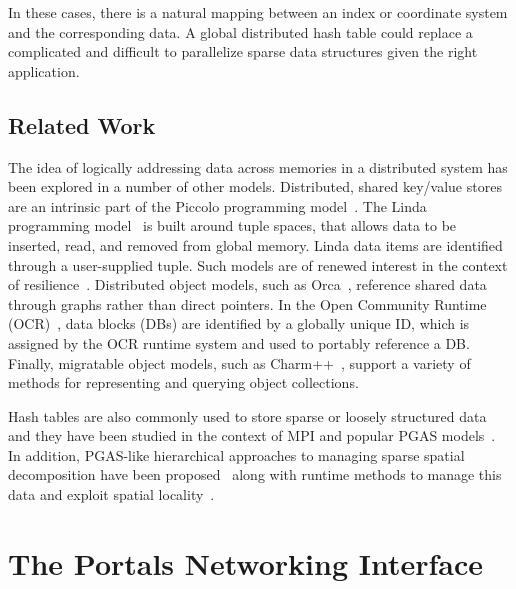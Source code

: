 In these cases, there is a natural mapping between an index or
coordinate system and the corresponding data. A global distributed
hash table could replace a complicated and difficult to parallelize
sparse data structures given the right application.

\subsection{Related Work}

The idea of logically addressing data across memories in a distributed
system has been explored in a number of other models.  Distributed,
shared key/value stores are an intrinsic part of the Piccolo
programming model~\cite{power:10}.  The Linda programming
model~\cite{ahuja:86} is built around tuple spaces, that allows data
to be inserted, read, and removed from global memory. Linda data items
are identified through a user-supplied tuple.  Such models are of
renewed interest in the context of resilience~\cite{wilke:14}.
Distributed object models, such as Orca~\cite{bal:92}, reference
shared data through graphs rather than direct pointers.  In the Open
Community Runtime (OCR)~\cite{OCR}, data blocks (DBs) are identified
by a globally unique ID, which is assigned by the OCR runtime system
and used to portably reference a DB.  Finally, migratable object
models, such as Charm++~\cite{kale:93}, support a variety of methods
for representing and querying object collections.

Hash tables are also commonly used to store sparse or loosely structured data
and they have been studied in the context of MPI and popular PGAS
models~\cite{maynard:12}.  In addition, PGAS-like hierarchical approaches to
managing sparse spatial decomposition have been proposed~\cite{larkins:08}
along with runtime methods to manage this data and exploit spatial
locality~\cite{larkins:12}.

\section{The Portals Networking Interface}





